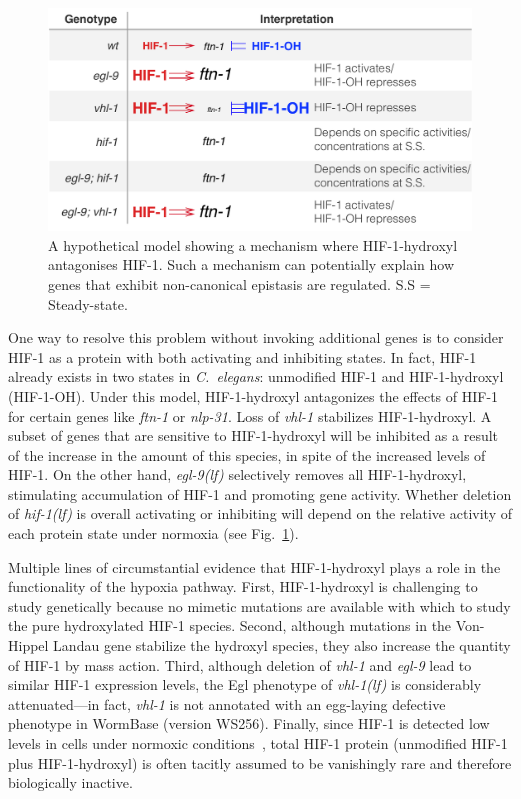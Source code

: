 \documentclass[9pt,twocolumn,twoside]{pnas-new}
\newcommand{\cel}{\emph{C.~elegans}}
\newcommand{\gene}[1]{\emph{#1}}
\newcommand{\nlp}{\emph{nlp-31}}
\newcommand{\ftna}{\emph{ftn-1}}
\newcommand{\egl}{\emph{egl-9(lf)}}
\newcommand{\vhl}{\emph{vhl-1(lf)}}
\newcommand{\hif}{\emph{hif-1(lf)}}
\newcommand{\hifp}{HIF-1}
\begin{document}
\begin{figure}[tbhp]
\centering
\includegraphics[width=\linewidth]{figs/hif1oh_model.pdf}
\caption{
A hypothetical model showing a mechanism where \hifp{}-hydroxyl antagonises
\hifp{}. Such a mechanism can potentially explain how genes that exhibit
non-canonical epistasis are regulated. S.S = Steady-state.
}
\label{fig:hif1oh_table}
\end{figure}

One way to resolve this problem without invoking additional genes is to
consider \hifp{} as a protein with both activating and inhibiting states. In fact,
\hifp{} already exists in two states in \cel{}: unmodified \hifp{} and
\hifp{}-hydroxyl (\hifp{}-OH). Under this model, \hifp{}-hydroxyl antagonizes
the effects of \hifp{} for certain genes like \ftna{} or \nlp{}. Loss of
\gene{vhl-1} stabilizes \hifp{}-hydroxyl.
A subset of genes that are sensitive to \hifp{}-hydroxyl will be inhibited as a
result of the increase in the amount of this species, in spite of the increased
levels of \hifp{}.
On the other hand, \egl{} selectively removes all \hifp{}-hydroxyl, stimulating
accumulation of \hifp{} and promoting gene activity. Whether deletion of \hif{}
is overall activating or inhibiting will depend on the relative activity of each
protein state under normoxia (see Fig.~\ref{fig:hif1oh_table}).

Multiple lines of circumstantial evidence that \hifp{}-hydroxyl plays a role
in the functionality of the hypoxia pathway. First, \hifp{}-hydroxyl is
challenging to study genetically because no mimetic mutations are available with
which to study the pure hydroxylated \hifp{} species. Second, although mutations in
the Von-Hippel Landau gene stabilize the hydroxyl species, they also increase the
quantity of \hifp{} by mass action. Third, although deletion of \gene{vhl-1} and
\gene{egl-9} lead to similar \hifp{} expression levels, the Egl phenotype of
\vhl{} is considerably attenuated---in fact, \gene{vhl-1} is not annotated with
an egg-laying defective phenotype in WormBase (version WS256).
Finally, since \hifp{} is detected low levels
in cells under normoxic conditions~\cite{Wang1993}, total \hifp{} protein
(unmodified \hifp{} plus \hifp{}-hydroxyl) is often tacitly assumed to be
vanishingly rare and therefore biologically inactive.
\end{document}
